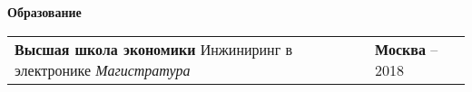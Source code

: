 \documentclass{article}
\begin{document}
\textbf{Образование}
\begin{table}[h!]
\begin{center}

\def\arraystretch{2}%

\begin{tabular}
{ L{14cm} R{4cm} } \hhline{|=|=|}

\textbf{Высшая школа экономики}\newline
Инжиниринг в электронике\newline
\emph{Магистратура}\newline
& \textbf{Москва} – 2018\\

\end{tabular}
\end{center}
\end{table}
\end{document}

